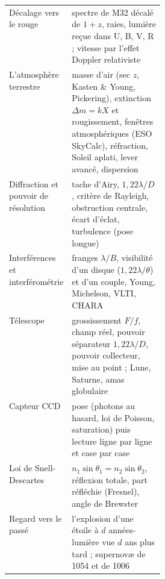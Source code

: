 \begin{center}
\begin{tabularx}{\linewidth}{@{}>{\raggedright}p{0.30\linewidth}X@{}}
Décalage vers le rouge & spectre de M32 décalé de $1+z$, raies, lumière reçue dans U, B, V, R ; vitesse par l'effet Doppler relativiste\\
L'atmosphère terrestre & masse d'air (sec $z$, Kasten \& Young, Pickering), extinction $\Delta m = kX$ et rougissement, fenêtres atmosphériques (ESO SkyCalc), réfraction, Soleil aplati, lever avancé, dispersion\\
Diffraction et pouvoir de résolution & tache d'Airy, $1{,}22\lambda/D$, critère de Rayleigh, obstruction centrale, écart d'éclat, turbulence (pose longue)\\
Interférences et interférométrie & franges $\lambda/B$, visibilité d'un disque ($1{,}22\lambda/\theta$) et d'un couple, Young, Michelson, VLTI, CHARA\\
Télescope & grossissement $F/f$, champ réel, pouvoir séparateur $1{,}22\lambda/D$, pouvoir collecteur, mise au point ; Lune, Saturne, amas globulaire\\
Capteur CCD & pose (photons au hasard, loi de Poisson, saturation) puis lecture ligne par ligne et case par case\\
Loi de Snell-Descartes & $n_1\sin\theta_1=n_2\sin\theta_2$, réflexion totale, part réfléchie (Fresnel), angle de Brewster\\
Regard vers le passé & l'explosion d'une étoile à $d$ années-lumière vue $d$ ans plus tard ; supernovæ de 1054 et de 1006\\
\bottomrule
\end{tabularx}
\end{center}


